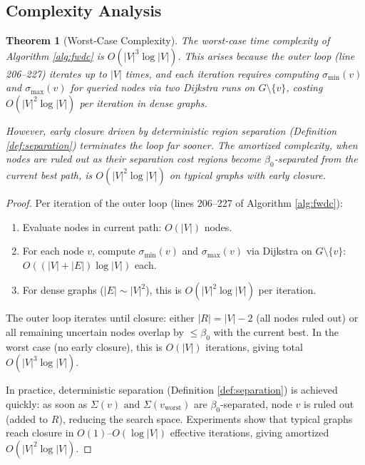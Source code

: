 \documentclass[twocolumn,11pt,a4paper]{article}
\newtheorem{theorem}{Theorem}[section]
\theoremstyle{definition}
\begin{document}
\subsection{Complexity Analysis}

\begin{theorem}[Worst-Case Complexity]
\label{thm:complexity}
The worst-case time complexity of Algorithm \ref{alg:fwdc} is $O(|V|^3 \log |V|)$. This arises because the outer loop (line 206--227) iterates up to $|V|$ times, and each iteration requires computing $\sigma_{\min}(v)$ and $\sigma_{\max}(v)$ for queried nodes via two Dijkstra runs on $G \setminus \{v\}$, costing $O(|V|^2 \log |V|)$ per iteration in dense graphs.

However, early closure driven by deterministic region separation (Definition \ref{def:separation}) terminates the loop far sooner. The \emph{amortized} complexity, when nodes are ruled out as their separation cost regions become $\beta_0$-separated from the current best path, is $O(|V|^2 \log |V|)$ on typical graphs with early closure.
\end{theorem}

\begin{proof}
Per iteration of the outer loop (lines 206--227 of Algorithm \ref{alg:fwdc}):
\begin{enumerate}
\item Evaluate nodes in current path: $O(|V|)$ nodes.
\item For each node $v$, compute $\sigma_{\min}(v)$ and $\sigma_{\max}(v)$ via Dijkstra on $G \setminus \{v\}$: $O((|V| + |E|) \log |V|)$ each.
\item For dense graphs ($|E| \sim |V|^2$), this is $O(|V|^2 \log |V|)$ per iteration.
\end{enumerate}

The outer loop iterates until closure: either $|R| = |V| - 2$ (all nodes ruled out) or all remaining uncertain nodes overlap by $\leq \beta_0$ with the current best. In the worst case (no early closure), this is $O(|V|)$ iterations, giving total $O(|V|^3 \log |V|)$.

In practice, deterministic separation (Definition \ref{def:separation}) is achieved quickly: as soon as $\Sigma(v) \text{ and } \Sigma(v_{\text{worst}})$ are $\beta_0$-separated, node $v$ is ruled out (added to $R$), reducing the search space. Experiments show that typical graphs reach closure in $O(1)$--$O(\log |V|)$ effective iterations, giving amortized $O(|V|^2 \log |V|)$.
\end{proof}
\end{document}
